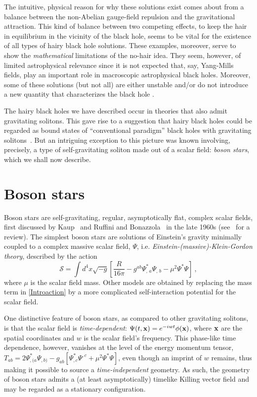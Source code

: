 The intuitive, physical reason for why these solutions exist comes about from a balance between the non-Abelian gauge-field repulsion and the gravitational attraction.
This kind of balance between two competing effects, to keep the hair in equilibrium in the vicinity of the black hole, seems to be vital for the existence of all types of hairy black hole solutions.
These examples, moreover, serve to show the \textit{mathematical} limitations of the no-hair idea.
They seem, however, of limited astrophysical relevance since it is not expected that, say, Yang-Mills fields, play an important role in macroscopic astrophysical black holes.
Moreover, some of these solutions (but not all) are  either unstable and/or do not introduce a new quantity that characterizes the black hole \cite{Mavromatos:1995fc}.

The hairy black holes we have described occur in theories that also admit gravitating solitons. This gave rise to a suggestion that hairy black holes could be regarded as bound states of ``conventional paradigm'' black holes with gravitating solitons~\cite{Ashtekar:2000nx}. But an intriguing exception to this picture was known involving, precisely, a type of self-gravitating soliton made out of a scalar field: \textit{boson stars}, which we shall now describe.





\section{Boson stars}
\label{sec:bs}
Boson stars are self-gravitating, regular, asymptotically flat, complex scalar fields, first discussed by Kaup~\cite{Kaup:1968zz} and Ruffini and Bonazzola~\cite{Ruffini:1969qy} in the late 1960s (see~\cite{Schunck:2003kk} for a review).
The simplest boson stars are solutions of Einstein's gravity minimally coupled to a complex massive scalar field, $\Psi$, i.e. \textit{Einstein-(massive)-Klein-Gordon theory}, described by the action
\begin{equation}
\mathcal{S}= \int  d^4x\sqrt{-g}\left[\frac{R }{16\pi }
   - g^{ab}\Psi_{, \, a}^* \Psi_{, \, b} - \mu^2 \Psi^*\Psi
 \right] \ ,
 \label{Introaction}
 \end{equation}
where $\mu$ is the scalar field mass.
Other models are obtained by replacing the mass term in \eqref{Introaction} by a more complicated self-interaction potential for the scalar field. 

One distinctive feature of boson stars, as compared to other gravitating solitons, is that the scalar field is \textit{time-dependent}: $\Psi(t,{\bf x})=e^{-iwt}\phi({\bf x})$, where ${\bf x}$ are the spatial coordinates and $w$ is the scalar field's frequency.
This phase-like time dependence, however, vanishes at the level of the energy momentum tensor, $T_{ab}=2 \Psi_{ , (a}^*\Psi_{,b)}-g_{ab}  [  \Psi_{,c}^*\Psi^{,c}+\mu^2 \Psi^*\Psi]$, even though an imprint of $w$ remains, thus making it possible to source a \textit{time-independent} geometry.
As such, the geometry of boson stars admits a (at least asymptotically) timelike Killing vector field and may be regarded as a stationary configuration. 

